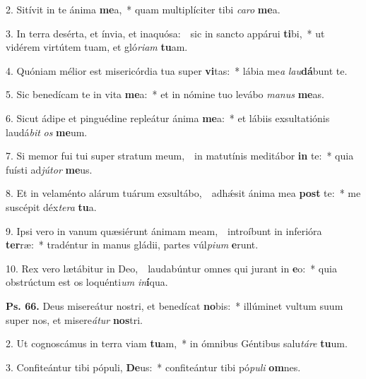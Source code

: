 
2. Sitívit in te ánima \textbf{me}a,~* quam multiplíciter tibi \textit{ca}\textit{ro} \textbf{me}a.

3. In terra desérta, et ínvia, et inaquósa:~\GreDagger\ sic in sancto appárui \textbf{ti}bi,~* ut vidérem virtútem tuam, et gló\textit{ri}\textit{am} \textbf{tu}am.

4. Quóniam mélior est misericórdia tua super \textbf{vi}tas:~* lábia me\textit{a} \textit{lau}\textbf{dá}bunt te.

5. Sic benedícam te in vita \textbf{me}a:~* et in nómine tuo levábo \textit{ma}\textit{nus} \textbf{me}as.

6. Sicut ádipe et pinguédine repleátur ánima \textbf{me}a:~* et lábiis exsultatiónis laudá\textit{bit} \textit{os} \textbf{me}um.

7. Si memor fui tui super stratum meum,~\GreDagger\ in matutínis meditábor \textbf{in} te:~* quia fuísti ad\textit{jú}\textit{tor} \textbf{me}us.

8. Et in velaménto alárum tuárum exsultábo,~\GreDagger\ adh\'{\ae}sit ánima mea \textbf{post} te:~* me suscépit déx\textit{te}\textit{ra} \textbf{tu}a.

9. Ipsi vero in vanum quæsiérunt ánimam meam,~\GreDagger\ introíbunt in inferióra \textbf{ter}ræ:~* tradéntur in manus gládii, partes vúl\textit{pi}\textit{um} \textbf{e}runt.

10. Rex vero lætábitur in Deo,~\GreDagger\ laudabúntur omnes qui jurant in \textbf{e}o:~* quia obstrúctum est os loquénti\textit{um} \textit{in}\textbf{í}qua.

\textbf{Ps. 66.} Deus misereátur nostri, et benedícat \textbf{no}bis:~* illúminet vultum suum super nos, et misere\textit{á}\textit{tur} \textbf{nos}tri.

2. Ut cognoscámus in terra viam \textbf{tu}am,~* in ómnibus Géntibus salu\textit{tá}\textit{re} \textbf{tu}um.

3. Confiteántur tibi pópuli, \textbf{De}us:~* confiteántur tibi pó\textit{pu}\textit{li} \textbf{om}nes.

